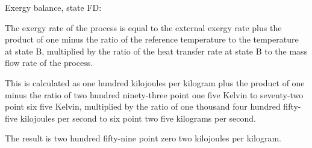 Exergy balance, state FD:

The exergy rate of the process is equal to the external exergy rate plus the product of one minus the ratio of the reference temperature to the temperature at state B, multiplied by the ratio of the heat transfer rate at state B to the mass flow rate of the process.

This is calculated as one hundred kilojoules per kilogram plus the product of one minus the ratio of two hundred ninety-three point one five Kelvin to seventy-two point six five Kelvin, multiplied by the ratio of one thousand four hundred fifty-five kilojoules per second to six point two five kilograms per second.

The result is two hundred fifty-nine point zero two kilojoules per kilogram.